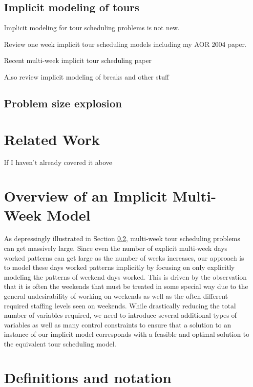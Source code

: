 \documentclass{article}
\begin{document}
\subsection{Implicit modeling of tours}

Implicit modeling for tour scheduling problems is not new. 

Review one week implicit tour scheduling models including my AOR 2004 paper.

Recent multi-week implicit tour scheduling paper

Also review implicit modeling of breaks and other stuff

\subsection{Problem size explosion}
\label{subsec-explosion}




\section{Related Work}
\label{sec-relatedwork}

If I haven't already covered it above
 

\section{Overview of an Implicit Multi-Week Model}
\label{sec-overview}

As depressingly illustrated in Section \ref{subsec-explosion}, multi-week tour scheduling problems can get massively large. Since even the number of explicit multi-week days worked patterns can get large as the number of weeks increases, our approach is to model these days worked patterns implicitly by focusing on only explicitly modeling the patterns of weekend days worked. This is driven by the observation that it is often the weekends that must be treated in some special way due to the general undesirability of working on weekends as well as the often different required staffing levels seen on weekends. While drastically reducing the total number of variables required, we need to introduce several additional types of variables as well as many control constraints to ensure that a solution to an instance of our implicit model corresponds with a feasible and optimal solution to the equivalent tour scheduling model.



\section{Definitions and notation}
\label{sec-mwts}
\end{document}
